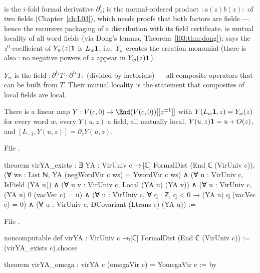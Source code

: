 \begin{dictionary}
 is the $i$-fold formal derivative $\partial_z^i$;  is the normal-ordered
product ${:}a(z)b(z){:}$ of two fields (Chapter~\ref{ch:L03}), which needs proofs that both factors are
fields --- hence the recursive packaging  of a distribution with its field
certificate.  is mutual locality of all word fields (via Dong's lemma,
Theorem~\ref{l03:thm:dong});  says the $z^0$-coefficient of $Y_w(z)\mathbf{1}$ is
$L_w\mathbf{1}$, i.e.\ $Y_w$ creates the creation monomial (there is also : no
negative powers of $z$ appear in $Y_w(z)\mathbf{1}$).
\end{dictionary}

\begin{physics}
$Y_w$ is the field ${:}\partial^{i_1}T\cdots\partial^{i_k}T{:}$ (divided by factorials) --- all composite
operators that can be built from $T$. Their mutual locality is the statement that composites of local
fields are local.
\end{physics}

\begin{theorem}\label{l06:thm:virYA}
There is a linear map $Y:\lsixV\to\End(\lsixV)[[z^{\pm1}]]$ with $Y(L_w\mathbf{1},z) = Y_w(z)$ for every
word $w$, every $Y(u,z)$ a field, all mutually local, $Y(u,z)\mathbf{1} = u+O(z)$, and
$[L_{-1},Y(u,z)] = \partial_zY(u,z)$.
\end{theorem}

File .
\begin{leancode}
theorem virYA_exists :
    ∃ YA : VirUniv c →ₗ[ℂ] FormalDist (End ℂ (VirUniv c)),
      (∀ ws : List ℕ, YA (negWordVir c ws) = YwordVir c ws) ∧
      (∀ u : VirUniv c, IsField (YA u)) ∧
      (∀ u v : VirUniv c, Local (YA u) (YA v)) ∧
      (∀ u : VirUniv c, (YA u) 0 (vacVec c) = u) ∧
      (∀ u : VirUniv c, ∀ q : ℤ, q < 0 → (YA u) q (vacVec c) = 0) ∧
      (∀ u : VirUniv c, DCovariant (Ltrans c) (YA u)) :=
\end{leancode}
File .
\begin{leancode}
noncomputable def virYA : VirUniv c →ₗ[ℂ] FormalDist (End ℂ (VirUniv c)) := (virYA_exists c).choose

theorem virYA_omega : virYA c (omegaVir c) = YomegaVir c := by
\end{leancode}

